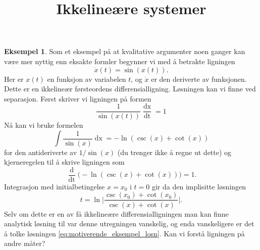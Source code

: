 \documentclass{article}
\title{Ikkelineære systemer}
\author{}
\date{}
\theoremstyle{plain}
\theoremstyle{definition}
\newtheorem{eksempel}[teorem]{Eksempel}
\theoremstyle{remark}
\newcommand{\diff}[1]{\mathop{d#1}}
\newcommand{\fcn}{x}
\newcommand{\biggabs}[1]{\bigg|#1\bigg|}
\newcommand{\bigparanth}[1]{\big(#1\big)}
\begin{document}
\maketitle


\begin{eksempel}
    Som et eksempel på at kvalitative argumenter noen ganger kan være mer nyttig enn eksakte formler begynner vi med å betrakte ligningen
    \begin{equation} \label{eks:motiverende_eksempel}
        \dot{\fcn}(t) = \sin(\fcn(t)).
    \end{equation}
    Her er $x(t)$ en funksjon av variabelen $t$, og $\dot{x}$ er den deriverte av funksjonen. Dette er en ikkelineær førsteordens differensialligning. Løsningen kan vi finne ved separasjon. Først skriver vi ligningen på formen
    \begin{equation*}
        \frac{1}{\sin(\fcn(t))} \frac{\diff{\fcn(t)}}{\diff{t}} = 1
    \end{equation*}
    Nå kan vi bruke formelen
    \begin{equation*}
        \int \frac{1}{\sin(\fcn)} \diff{\fcn} = -\ln(\csc(\fcn) + \cot(\fcn))
    \end{equation*}
    for den antideriverte av $1/\sin(\fcn)$ (du trenger ikke å regne ut dette) og kjerneregelen til å skrive ligningen som
    \begin{equation*}
        \frac{\diff{}}{\diff{t}} \bigparanth{-\ln(\csc(\fcn) + \cot(\fcn))} = 1.
    \end{equation*}
    Integrasjon med initialbetingelse $\fcn = \fcn_0$ i $t = 0$ gir da den implisitte løsningen
    \begin{equation} \label{eq:motiverende_eksempel_losn}
        t = \ln \biggabs{ \frac{\csc(\fcn_0) + \cot(\fcn_0)}{\csc(\fcn) + \cot(\fcn)}}.
    \end{equation}
    Selv om dette er en av få ikkelineære differensialligningen man kan finne analytisk løsning til var denne utregningen vanskelig, og enda vanskeligere er det å tolke løsningen \eqref{eq:motiverende_eksempel_losn}. Kan vi forstå ligningen på andre måter?
    

\end{eksempel}
\end{document}
